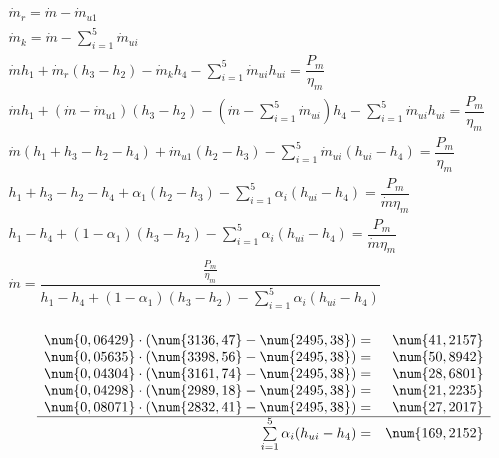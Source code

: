 \begin{math}
	\begin{array}{l}
		\dot m_r = \dot m - \dot m_{u1} \\
		\dot m_k = \dot m - \sum\limits_{i=1}^5 \dot m_{ui} \\
		\dot m h_1 + \dot m_r (h_3 - h_2) - \dot m_k h_4
			- \sum\limits_{i=1}^5 \dot m_{ui} h_{ui} = \dfrac{P_m}{\eta_m} \\
		\dot m h_1 + (\dot m - \dot m_{u1})(h_3 - h_2)
			- (\dot m - \sum\limits_{i=1}^5 \dot m_{ui}) h_4
			- \sum\limits_{i=1}^5 \dot m_{ui} h_{ui} = \dfrac{P_m}{\eta_m} \\
		\dot m (h_1 + h_3 - h_2 - h_4) + \dot m_{u1} (h_2 - h_3)
			- \sum\limits_{i=1}^5 \dot m_{ui} (h_{ui} - h_{4}) = \dfrac{P_m}{\eta_m} \\

		h_1 + h_3 - h_2 - h_4 + \alpha_1 (h_2 - h_3)
			- \sum\limits_{i=1}^5 \alpha_i (h_{ui} - h_{4}) = \dfrac{P_m}{\dot m \eta_m} \\

		h_1 - h_4 + (1 - \alpha_1)(h_3 - h_2)
			- \sum\limits_{i=1}^5 \alpha_i (h_{ui} - h_{4}) = \dfrac{P_m}{\dot m \eta_m} \\

		\dot m = \dfrac{\frac{P_m}{\eta_m}}{
			h_1 - h_4 + (1 - \alpha_1)(h_3 - h_2)
			- \sum\limits_{i=1}^5 \alpha_i (h_{ui} - h_{4})
		} \\
	\end{array}
\end{math}

\renewcommand{\arraystretch}{1}
\begin{math}
	\begin{array}{lrr}
		\;\;\;\;\;
		& \num{0,06429} \cdot ( \num{3136,47} - \num{2495,38} ) = & \num{41,2157} \\
		& \num{0,05635} \cdot ( \num{3398,56} - \num{2495,38} ) = & \num{50,8942} \\
		& \num{0,04304} \cdot ( \num{3161,74} - \num{2495,38} ) = & \num{28,6801} \\
		& \num{0,04298} \cdot ( \num{2989,18} - \num{2495,38} ) = & \num{21,2235} \\
		& \num{0,08071} \cdot ( \num{2832,41} - \num{2495,38} ) = & \num{27,2017} \\
		\cline{2-3}
		& \sum\limits_{i=1}^5 \alpha_i (h_{ui} - h_{4}) = & \num{169,2152} \\
	\end{array}
\end{math}

